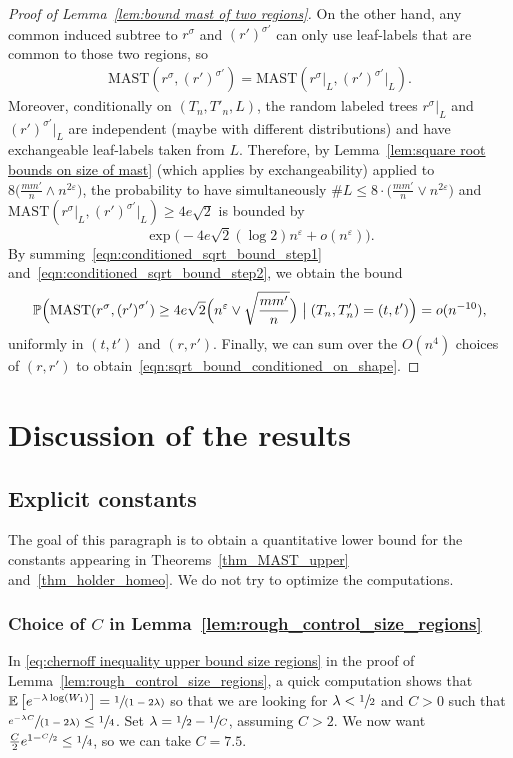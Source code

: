 \documentclass[JEP,XML,SOM,Unicode,NoFloatCountersInSection,published]{cedram}
\newcommand{\spfrac}[2]{\sfrac{#1}{(#2)}}
\newcommand{\Ec}[1]{\mathbb{E} \left[#1\right]}
\newcommand{\BPpsq}[2]{\mathbb{P} \Bigl(#1\bigm|#2\Bigr)}
\let\eps\varepsilon
\theoremstyle{plain}
\theoremstyle{definition}
\begin{document}
\begin{proof}[Proof of Lemma~\ref{lem:bound mast of two regions}]
On the other hand, any common induced subtree to $r^\sigma$ and $(r')^{\sigma'}$ can only use leaf-labels that are common to those two regions, so
\begin{align*}
\mathrm{MAST}(r^\sigma, (r')^{\sigma'})=\mathrm{MAST}(r^\sigma{|_L}, (r')^{\sigma'}{|_L}).
\end{align*}
Moreover, conditionally on $(T_n, T'_n,L)$, the random labeled trees $r^\sigma{|_L}$ and $(r')^{\sigma'}{|_L}$ are independent (maybe with different distributions) and have exchangeable leaf-labels taken from $L$. Therefore, by Lemma~\ref{lem:square root bounds on size of mast} (which applies by exchangeability) applied to $8 \bigl( \frac{mm'}{n} \wedge n^{2\eps} \bigr)$, the probability to have simultaneously $\#L \leq 8 \cdot \bigl(\frac{m m'}{n} \vee n^{2\eps} \bigr)$ and $\mathrm{MAST}(r^{\sigma}{|_L}, (r')^{\sigma'}{|_L})\geq 4e\sqrt{2}$ is bounded by
\begin{equation}\label{eqn:conditioned_sqrt_bound_step2}
\exp\bigl(-4e\sqrt{2}(\log 2) n^\eps + o(n^\eps) \bigr).
\end{equation}
By summing~\eqref{eqn:conditioned_sqrt_bound_step1} and~\eqref{eqn:conditioned_sqrt_bound_step2}, we obtain the bound
\[\BPpsq{\mathrm{MAST}(r^\sigma, (r')^{\sigma'})\geq 4e\sqrt{2} \Bigl( n^\eps \vee \sqrt{\frac{m m'}{n}} \Bigr)}{(T_n,T'_n)=(t,t')}=o(n^{-10}),\]
uniformly in $(t,t')$ and $(r,r')$. Finally, we can sum over the $O(n^4)$ choices of $(r,r')$ to obtain~\eqref{eqn:sqrt_bound_conditioned_on_shape}.
\end{proof}

\section{Discussion of the results} \label{sec:discussion of the results}

\subsection{Explicit constants}\label{subsec:explicit constants}

The goal of this paragraph is to obtain a quantitative lower bound for the constants appearing in Theorems~\ref{thm_MAST_upper} and~\ref{thm_holder_homeo}. We do not try to optimize the computations.

\subsubsection*{Choice of $C$ in Lemma~\ref{lem:rough_control_size_regions}}
In \eqref{eq:chernoff inequality upper bound size regions} in the proof of Lemma~\ref{lem:rough_control_size_regions}, a quick computation shows that $\Ec{e^{-\lambda \log(W_1)}}= \spfrac{1}{1-2\lambda}$ so that we are looking for $\lambda<\sfrac{1}{2}$ and $C>0$ such that $\spfrac{e^{-\lambda C}}{1-2\lambda} \leq \sfrac{1}{4}$.
Set $\lambda=\sfrac{1}{2}-\sfrac{1}{C}$, assuming $C>2$. We now want $\frac{C}{2}e^{1-\sfrac{C}{2}} \leq \sfrac{1}{4}$, so we can take $C=7.5$.
\end{document}
